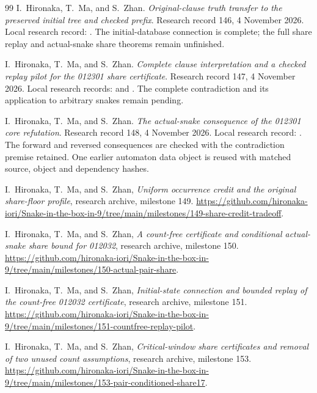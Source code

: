 \documentclass[11pt,a4paper]{article}
\theoremstyle{definition}
\theoremstyle{remark}
\begin{document}
\begin{thebibliography}{99}
I.~Hironaka, T.~Ma, and S.~Zhan. \emph{Original-clause truth transfer to the
preserved initial tree and checked prefix}. Research record 146,
4 November 2026. Local research record:
.
The initial-database connection is complete; the full share replay and
actual-snake share theorems remain unfinished.

I.~Hironaka, T.~Ma, and S.~Zhan. \emph{Complete clause interpretation and a
checked replay pilot for the 012301 share certificate}. Research record 147,
4 November 2026. Local research records:
and .
The complete contradiction and its application to arbitrary snakes remain pending.

I.~Hironaka, T.~Ma, and S.~Zhan. \emph{The actual-snake consequence of the
012301 core refutation}. Research record 148, 4 November 2026.
Local research record:
.
The forward and reversed consequences are checked with the contradiction
premise retained. One earlier automaton data object is reused with matched
source, object and dependency hashes.

I.~Hironaka, T.~Ma, and S.~Zhan, \emph{Uniform occurrence credit and the
original share-floor profile}, research archive, milestone 149.
\url{https://github.com/hironaka-iori/Snake-in-the-box-in-9/tree/main/milestones/149-share-credit-tradeoff}.

I.~Hironaka, T.~Ma, and S.~Zhan, \emph{A count-free certificate and
conditional actual-snake share bound for 012032}, research archive,
milestone 150.
\url{https://github.com/hironaka-iori/Snake-in-the-box-in-9/tree/main/milestones/150-actual-pair-share}.

I.~Hironaka, T.~Ma, and S.~Zhan, \emph{Initial-state connection and bounded
replay of the count-free 012032 certificate}, research archive, milestone 151.
\url{https://github.com/hironaka-iori/Snake-in-the-box-in-9/tree/main/milestones/151-countfree-replay-pilot}.

I.~Hironaka, T.~Ma, and S.~Zhan, \emph{Critical-window share certificates
and removal of two unused count assumptions}, research archive, milestone 153.
\url{https://github.com/hironaka-iori/Snake-in-the-box-in-9/tree/main/milestones/153-pair-conditioned-share17}.


\end{thebibliography}
\end{document}
